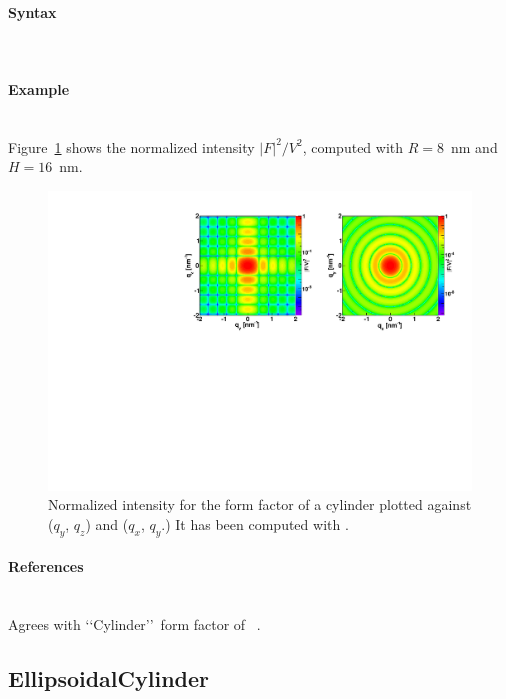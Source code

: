 \paragraph{Syntax}\strut\\

\newpage

\paragraph{Example}\strut\\
Figure~\ref{fig:FFcylinderEx} shows the normalized intensity
$|F|^2/V^2$, computed with $R=8$~nm and \mbox{$H=16$~nm.}
\begin{figure}[ht]
\begin{center}
\includegraphics[angle=-90,width=\textwidth]{fig/ff/figffcylinder.pdf}
\end{center}
\caption{Normalized intensity for the form factor of a cylinder plotted against ($q_y$, $q_z$) and  ($q_x$, $q_y$.) It
has been  computed with .}
\label{fig:FFcylinderEx}
\end{figure}

\paragraph{References}\strut\\
Agrees with \lq\lq Cylinder\rq\rq\ form factor of \IsGISAXS~\cite{Laz02}.

\newpage
\subsection{EllipsoidalCylinder}  

